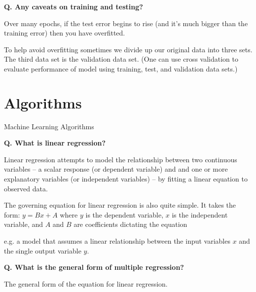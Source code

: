 \begin{frame}[fragile]{\textbf{Q. Any caveats on training and testing?}}
  \begin{wideitemize}
    \item Over many epochs, if the test error begins to rise (and it's much
    bigger than the training error) then you have overfitted.
    \item To help avoid overfitting sometimes we divide up our original data
    into three sets. The third data set is the validation data set.
    (One can use cross validation to evaluate performance of model using
    training, test, and validation data sets.)
  \end{wideitemize}
\end{frame}

\section{Algorithms}
\begin{transitionframe}
  \begin{center}
    \Huge Machine Learning Algorithms
  \end{center}
\end{transitionframe}


\begin{frame}[fragile]{\textbf{Q. What is linear regression?}}
  \begin{wideitemize}
  \item Linear regression attempts to model the relationship between two continuous
    variables -- a scalar response (or dependent variable) and and one or more
    explanatory variables (or independent variables) -- by fitting a linear
    equation to observed data.
  \item The governing equation for linear regression is also quite simple. It
    takes the form: $y = Bx + A$ where $y$ is the dependent variable, $x$ is the
    independent variable, and $A$ and $B$ are coefficients dictating the equation
  \item e.g. a model that assumes a linear relationship between the input
    variables $x$ and the single output variable $y$.
  \end{wideitemize}
\end{frame}

\begin{frame}[fragile]{\textbf{Q. What is the general form of multiple regression?}}
  \begin{wideitemize}
    \item The general form of the equation for linear regression.
  \end{wideitemize}
\end{frame}



